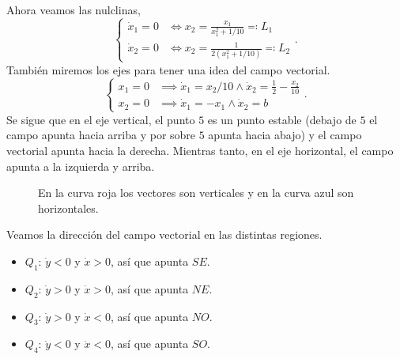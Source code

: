 \documentclass[10pt]{article}
\begin{document}
Ahora veamos las nulclinas,
\[
	\begin{cases}
		\dot x_1 = 0 & \iff x_2 = \frac{x_1}{x_1^2 + 1/10} \eqqcolon L_1\\
		\dot x_2 = 0 & \iff x_2 = \frac{1}{2(x_1^2 + 1/10)} \eqqcolon L_2
	\end{cases}
.\]
También miremos los ejes para tener una idea del campo vectorial.
\[
	\begin{cases}
		x_1 = 0&\implies \dot x_1 = x_2/10 \land \dot x_2 = \frac{1}{2} -
		\frac{x_2}{10}\\
		x_2 = 0&\implies \dot x_1 = -x_1 \land \dot x_2 = b
	\end{cases}
.\]
Se sigue que en el eje vertical, el punto \(5\) es un punto estable (debajo de
\(5\) el campo apunta hacia arriba y por sobre \(5\) apunta hacia abajo) y el campo
vectorial apunta hacia la derecha. Mientras tanto, en el eje horizontal, el
campo apunta a la izquierda y arriba.

\begin{figure}[H]
\centering
{}
\caption{En la curva roja los vectores son verticales y en la curva azul son
horizontales.}
\end{figure}

Veamos la dirección del campo vectorial en las distintas regiones.
\begin{itemize}
	\item \(Q_1\): \(\dot y < 0\) y \(\dot x > 0\), así que apunta \(SE\).
	\item \(Q_2\): \(\dot y > 0\) y \(\dot x > 0\), así que apunta \(NE\).
	\item \(Q_3\): \(\dot y > 0\) y \(\dot x < 0\), así que apunta \(NO\).
	\item \(Q_4\): \(\dot y < 0\) y \(\dot x < 0\), así que apunta \(SO\).
\end{itemize}
\end{document}
